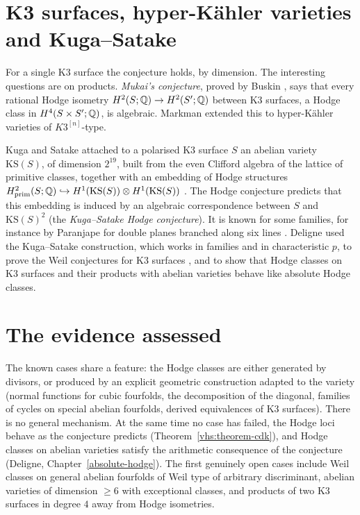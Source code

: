 \section{K3 surfaces, hyper-K\"ahler varieties and Kuga--Satake}\label{known-cases:section-k3}

\begin{remark}\label{known-cases:remark-k3}
For a single K3 surface the conjecture holds, by dimension. The interesting questions are on products. \emph{Mukai's conjecture}, proved by Buskin \cite{buskin-2019}, says that every rational Hodge
isometry $H^2(S; \mathbb{Q}) \to H^2(S'; \mathbb{Q})$ between K3 surfaces, a Hodge class in $H^4(S \times S'; \mathbb{Q})$, is algebraic. Markman extended this to hyper-K\"ahler varieties of $K3^{[n]}$-type.
\end{remark}

\begin{remark}\label{known-cases:remark-kuga-satake}
Kuga and Satake attached to a polarised K3 surface $S$ an abelian variety $\mathrm{KS}(S)$, of dimension $2^{19}$, built from the even Clifford algebra of the lattice of primitive classes, together with
an embedding of Hodge structures $H^2_{\mathrm{prim}}(S; \mathbb{Q}) \hookrightarrow H^1(\mathrm{KS}(S)) \otimes H^1(\mathrm{KS}(S))$ \cite{kuga-satake-1967}. The Hodge conjecture predicts that this embedding is
induced by an algebraic correspondence between $S$ and $\mathrm{KS}(S)^2$ (the \emph{Kuga--Satake Hodge conjecture}). It is known for some families, for instance by Paranjape for double planes branched
along six lines \cite{paranjape-1988}. Deligne used the Kuga--Satake construction, which works in families and in characteristic $p$, to prove the Weil conjectures for K3 surfaces
\cite{deligne-k3}, and to show that Hodge classes on K3 surfaces and their products with abelian varieties behave like absolute Hodge classes.
\end{remark}

\section{The evidence assessed}\label{known-cases:section-assessment}

\begin{remark}\label{known-cases:remark-assessment}
The known cases share a feature: the Hodge classes are either generated by divisors, or produced by an explicit geometric construction adapted to the variety (normal functions for cubic fourfolds,
the decomposition of the diagonal, families of cycles on special abelian fourfolds, derived equivalences of K3 surfaces). There is no general mechanism. At the same time no case has failed, the
Hodge loci behave as the conjecture predicts (Theorem~\ref{vhs:theorem-cdk}), and Hodge classes on abelian varieties satisfy the arithmetic consequence of the conjecture (Deligne,
Chapter~\ref{absolute-hodge}). The first genuinely open cases include Weil classes on general abelian fourfolds of Weil type of arbitrary discriminant, abelian varieties of dimension $\geq 6$ with
exceptional classes, and products of two K3 surfaces in degree $4$ away from Hodge isometries.
\end{remark}

